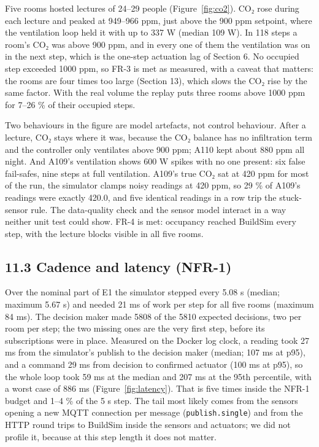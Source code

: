 \documentclass[11pt]{article}
\makeatletter
\DeclareRobustCommand{\_}{\ifmmode\nfss@text{\textunderscore}\else\textunderscore\allowbreak\fi}
\makeatother
\begin{document}
Five rooms hosted lectures of 24–29 people (Figure~\ref{fig:co2}). CO₂ rose
during each lecture and peaked at 949–966 ppm, just above the 900 ppm setpoint,
where the ventilation loop held it with up to 337 W (median 109 W). In 118 steps a room's
CO₂ was above 900 ppm, and in every one of them the ventilation was on in the next
step, which is the one-step actuation lag of Section 6. No occupied step exceeded
1000 ppm, so FR-3 is met as measured, with a caveat that matters: the rooms are
four times too large (Section 13), which slows the CO₂ rise by the same factor.
With the real volume the replay puts three rooms above 1000 ppm for 7–26 \% of
their occupied steps.

Two behaviours in the figure are model artefacts, not control behaviour. After a
lecture, CO₂ stays where it was, because the CO₂ balance has no infiltration term
and the controller only ventilates above 900 ppm; A110 kept about 880 ppm all
night. And A109's ventilation shows 600 W spikes with no one present: six false
fail-safes, nine steps at full ventilation. A109's true CO₂ sat at 420 ppm for
most of the run, the simulator clamps noisy readings at 420 ppm, so 29 \% of
A109's readings were exactly 420.0, and five identical readings in a row trip the
stuck-sensor rule. The data-quality
check and the sensor model interact in a way neither unit test could show.
FR-4 is met: occupancy reached BuildSim every step, with the lecture blocks
visible in all five rooms.

\subsection{11.3 Cadence and latency (NFR-1)}

Over the nominal part of E1 the simulator stepped every 5.08 s (median;
maximum 5.67 s) and needed 21 ms of work per step for all five rooms (maximum
84 ms). The decision maker made 5808 of the 5810 expected decisions, two per room
per step; the two missing ones are the very first step, before its subscriptions
were in place. Measured on the Docker log clock, a reading took 27 ms from the
simulator's publish to the decision maker (median; 107 ms at p95), and a command
29 ms from decision to confirmed actuator (100 ms at p95), so the whole loop took
59 ms at the median and 207 ms at the 95th percentile, with a worst case of
886 ms (Figure~\ref{fig:latency}). That is five times inside the NFR-1 budget and
1–4 \% of the 5 s step. The tail most likely comes from the sensors opening a new
MQTT connection per message (\texttt{publish.single}) and from the HTTP round
trips to BuildSim inside the sensors and actuators; we did not profile it, because
at this step length it does not matter.
\end{document}
